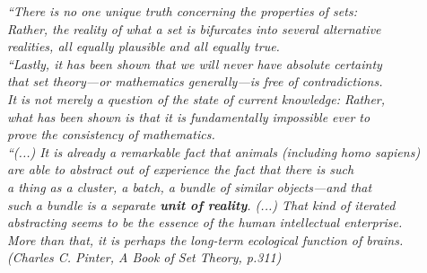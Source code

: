 \documentclass[
12pt,				%
openright,			%
oneside,			%
a4paper,			%
brazil,				%
english,			  %
]{abntex2}
\begin{document}
\begin{epigrafe}
    \vspace*{\fill}
	\begin{flushright}
          \textit{``There is no one unique truth concerning the properties of
            sets:\\
            Rather, the reality of what a set is bifurcates into several alternative\\
            realities, all equally plausible and all equally true.\\
            ``Lastly, it has been shown that we will never have absolute certainty\\
            that set theory—or mathematics generally—is free of contradictions.\\
            It is not merely a question of the state of current knowledge: Rather,\\
            what has been shown is that it is fundamentally impossible ever to\\
            prove the consistency of mathematics.\\
            ``(...) It is already a remarkable fact that animals (including homo sapiens)\\
            are able to abstract out of experience the fact that there is such\\
            a thing as a cluster, a batch, a bundle of similar objects—and that\\
            such a bundle is a separate \textbf{unit of reality}. (...) That kind of iterated\\
            abstracting seems to be the essence of the human intellectual enterprise.\\
            More than that, it is perhaps the long-term ecological function of brains.\\
            (Charles C. Pinter, A Book of Set Theory, p.311)}
	\end{flushright}
\end{epigrafe}

\end{document}
